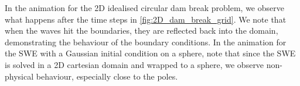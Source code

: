 In the animation for the 2D idealised circular dam break problem, we observe what happens after the time steps in \autoref{fig:2D_dam_break_grid}.
We note that when the waves hit the boundaries, they are reflected back into the domain, demonstrating the behaviour of the boundary conditions.
In the animation for the SWE with a Gaussian initial condition on a sphere, note that since the SWE is solved in a 2D cartesian domain and wrapped to a sphere, we observe non-physical behaviour, especially close to the poles.


